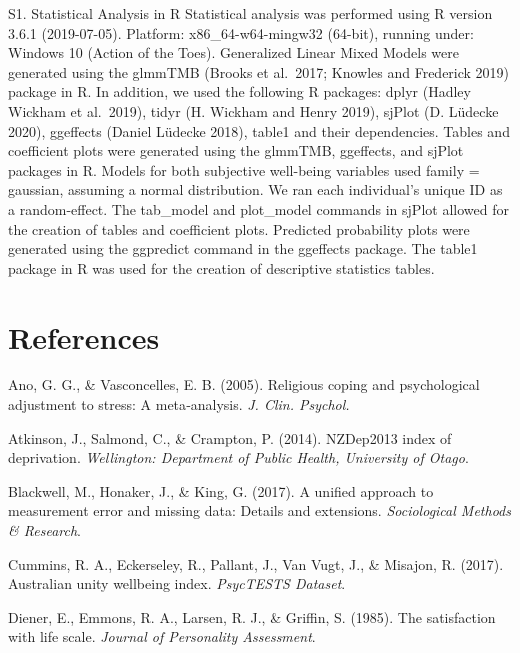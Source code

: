 \documentclass[
  english,
  man]{apa6}
\begin{document}
S1. Statistical Analysis in R
Statistical analysis was performed using R version 3.6.1 (2019-07-05). Platform: x86\_64-w64-mingw32 (64-bit), running under: Windows 10 (Action of the Toes). Generalized Linear Mixed Models were generated using the glmmTMB (Brooks et al.~2017; Knowles and Frederick 2019) package in R. In addition, we used the following R packages: dplyr (Hadley Wickham et al.~2019), tidyr (H. Wickham and Henry 2019), sjPlot (D. Lüdecke 2020), ggeffects (Daniel Lüdecke 2018), table1 and their dependencies.
Tables and coefficient plots were generated using the glmmTMB, ggeffects, and sjPlot packages in R. Models for both subjective well-being variables used family = gaussian, assuming a normal distribution. We ran each individual's unique ID as a random-effect. The tab\_model and plot\_model commands in sjPlot allowed for the creation of tables and coefficient plots. Predicted probability plots were generated using the ggpredict command in the ggeffects package. The table1 package in R was used for the creation of descriptive statistics tables.

\newpage

\hypertarget{references}{%
\section{References}\label{references}}

\begingroup
\setlength{\parindent}{-0.5in}
\setlength{\leftskip}{0.5in}

\hypertarget{refs}{}
\leavevmode\hypertarget{ref-Ano2005-hx}{}%
Ano, G. G., \& Vasconcelles, E. B. (2005). Religious coping and psychological adjustment to stress: A meta‐analysis. \emph{J. Clin. Psychol.}

\leavevmode\hypertarget{ref-Atkinson2014-ex}{}%
Atkinson, J., Salmond, C., \& Crampton, P. (2014). NZDep2013 index of deprivation. \emph{Wellington: Department of Public Health, University of Otago}.

\leavevmode\hypertarget{ref-Blackwell2017-oq}{}%
Blackwell, M., Honaker, J., \& King, G. (2017). A unified approach to measurement error and missing data: Details and extensions. \emph{Sociological Methods \& Research}.

\leavevmode\hypertarget{ref-Cummins2017-ur}{}%
Cummins, R. A., Eckerseley, R., Pallant, J., Van Vugt, J., \& Misajon, R. (2017). Australian unity wellbeing index. \emph{PsycTESTS Dataset}.

\leavevmode\hypertarget{ref-Diener1985-xy}{}%
Diener, E., Emmons, R. A., Larsen, R. J., \& Griffin, S. (1985). The satisfaction with life scale. \emph{Journal of Personality Assessment}.
\end{document}
